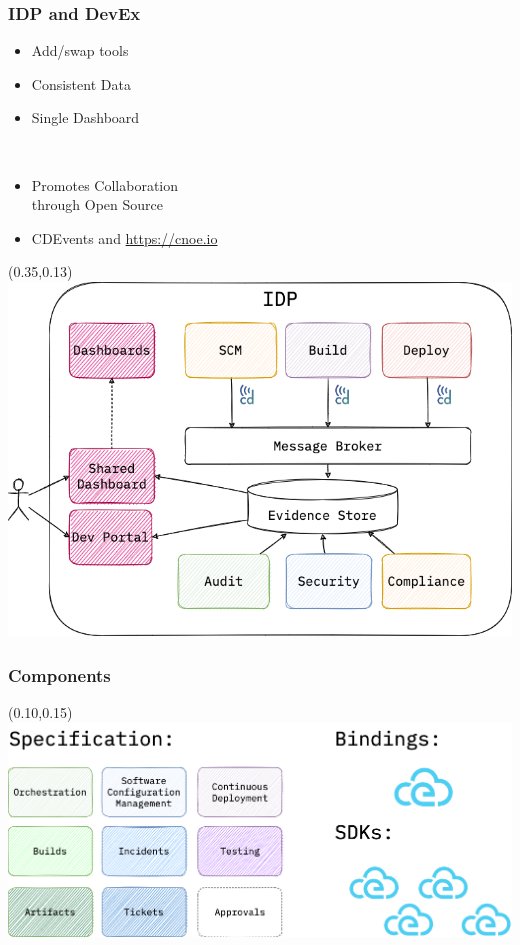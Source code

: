 \documentclass[aspectratio=169,11pt,hyperref={colorlinks=true}]{beamer}
\begin{document}
\begin{grayframe}
  \frametitle{IDP and DevEx}
  \begin{itemize}
    \item Add/swap tools
    \item Consistent Data
    \item Single Dashboard
  \end{itemize}
  ~ \\
  \begin{itemize}
    \item Promotes Collaboration \\
          through Open Source
    \item CDEvents and \href{CNOE.io}{https://cnoe.io}
  \end{itemize}
  \begin{textblock*}{0.60\paperwidth}(0.35\paperwidth,0.13\paperheight)
    \includegraphics[width=0.60\paperwidth]{img/cdevents-idp-cdevents.png}
  \end{textblock*}
\end{grayframe}

\begin{grayframe}
  \frametitle{Components}
  \begin{textblock*}{0.80\paperwidth}(0.10\paperwidth,0.15\paperheight)
    \includegraphics[width=0.80\paperwidth]{img/cdevents-components.png}
  \end{textblock*}
\end{grayframe}
\end{document}
